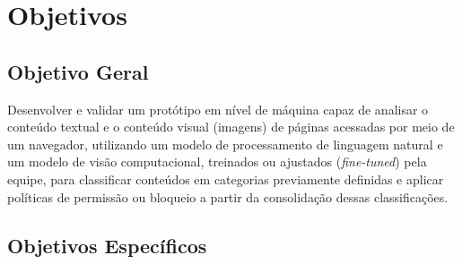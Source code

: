 \documentclass[
    12pt,           %
    oneside,        %
    a4paper,        %
    chapter=TITLE,  %
    english,        %
    brazil          %
]{abntex2}
\begin{document}
\chapter{Objetivos}

\section{Objetivo Geral}

Desenvolver e validar um protótipo em nível de máquina capaz de analisar o
conteúdo textual e o conteúdo visual (imagens) de páginas acessadas por meio
de um navegador, utilizando um modelo de processamento de linguagem natural e
um modelo de visão computacional, treinados ou ajustados (\textit{fine-tuned})
pela equipe, para classificar conteúdos em categorias previamente definidas e
aplicar políticas de permissão ou bloqueio a partir da consolidação dessas
classificações.

\section{Objetivos Específicos}
\end{document}
